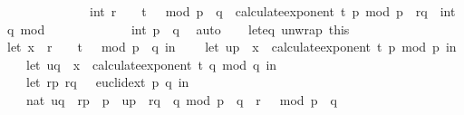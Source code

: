 \begin{isabellebody}
\ \ \ \ \ \ \ \ \ \ \ \ \ \ int\ {\isacharparenleft}{\kern0pt}{\isacharparenleft}{\kern0pt}r\ {\isacharcircum}{\kern0pt}\ {}\ {\isacharcircum}{\kern0pt}\ {\isacharparenleft}{\kern0pt}t\ {\isacharplus}{\kern0pt}\ {}{\isacharparenright}{\kern0pt}\ mod\ {\isacharparenleft}{\kern0pt}p\ {\isacharasterisk}{\kern0pt}\ q{\isacharparenright}{\kern0pt}{\isacharparenright}{\kern0pt}\ {\isacharcircum}{\kern0pt}\ calculate{\isacharunderscore}{\kern0pt}exponent\ t\ p\ mod\ p{\isacharparenright}{\kern0pt}\ {\isacharasterisk}{\kern0pt}\ r{\isacharunderscore}{\kern0pt}q\ {\isacharasterisk}{\kern0pt}\ int\ q{\isacharparenright}{\kern0pt}\ mod\isanewline
\ \ \ \ \ \ \ \ \ \ \ \ \ int\ {\isacharparenleft}{\kern0pt}p\ {\isacharasterisk}{\kern0pt}\ q{\isacharparenright}{\kern0pt}{\isacharparenright}{\kern0pt}{\isacharparenright}{\kern0pt}{\isachardoublequoteclose}\ \isamarkupfalse%
\ auto\isanewline
\isanewline
\ \ \isamarkupfalse%
\ let{\isacharunderscore}{\kern0pt}eq\ unwrap\ this\ \isamarkupfalse%
\ {\isachardoublequoteopen}{\isacharparenleft}{\kern0pt}let\ x\ {\isacharequal}{\kern0pt}\ r\ {\isacharcircum}{\kern0pt}\ {\isacharparenleft}{\kern0pt}{}\ {\isacharcircum}{\kern0pt}\ {\isacharparenleft}{\kern0pt}t\ {\isacharplus}{\kern0pt}\ {}{\isacharparenright}{\kern0pt}{\isacharparenright}{\kern0pt}\ mod\ {\isacharparenleft}{\kern0pt}p\ {\isacharasterisk}{\kern0pt}\ q{\isacharparenright}{\kern0pt}\ in\isanewline
\ \ \ \ let\ u{\isacharunderscore}{\kern0pt}p\ {\isacharequal}{\kern0pt}\ x\ {\isacharcircum}{\kern0pt}\ {\isacharparenleft}{\kern0pt}calculate{\isacharunderscore}{\kern0pt}exponent\ t\ p{\isacharparenright}{\kern0pt}\ mod\ p\ in\isanewline
\ \ \ \ let\ u{\isacharunderscore}{\kern0pt}q\ {\isacharequal}{\kern0pt}\ x\ {\isacharcircum}{\kern0pt}\ {\isacharparenleft}{\kern0pt}calculate{\isacharunderscore}{\kern0pt}exponent\ t\ q{\isacharparenright}{\kern0pt}\ mod\ q\ in\isanewline
\ \ \ \ let\ {\isacharparenleft}{\kern0pt}{\isacharparenleft}{\kern0pt}r{\isacharunderscore}{\kern0pt}p{\isacharcomma}{\kern0pt}\ r{\isacharunderscore}{\kern0pt}q{\isacharparenright}{\kern0pt}{\isacharcomma}{\kern0pt}\ {\isacharunderscore}{\kern0pt}{\isacharparenright}{\kern0pt}\ {\isacharequal}{\kern0pt}\ euclid{\isacharunderscore}{\kern0pt}ext\ p\ q\ in\isanewline
\ \ \ \ nat\ {\isacharparenleft}{\kern0pt}{\isacharparenleft}{\kern0pt}u{\isacharunderscore}{\kern0pt}q\ {\isacharasterisk}{\kern0pt}\ r{\isacharunderscore}{\kern0pt}p\ {\isacharasterisk}{\kern0pt}\ p\ {\isacharplus}{\kern0pt}\ u{\isacharunderscore}{\kern0pt}p\ {\isacharasterisk}{\kern0pt}\ r{\isacharunderscore}{\kern0pt}q\ {\isacharasterisk}{\kern0pt}\ q{\isacharparenright}{\kern0pt}\ mod\ {\isacharparenleft}{\kern0pt}p\ {\isacharasterisk}{\kern0pt}\ q{\isacharparenright}{\kern0pt}{\isacharparenright}{\kern0pt}{\isacharparenright}{\kern0pt}\ {\isacharequal}{\kern0pt}\ r\ {\isacharcircum}{\kern0pt}\ {}\ mod\ {\isacharparenleft}{\kern0pt}p\ {\isacharasterisk}{\kern0pt}\ q{\isacharparenright}{\kern0pt}{\isachardoublequoteclose}\ \isamarkupfalse%

\end{isabellebody}

